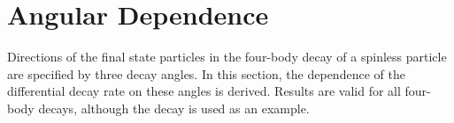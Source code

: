 \section{Angular Dependence} \label{sec:angDependence}
Directions of the final state particles in the four-body decay of a spinless particle are specified
by three decay angles. In this section, the dependence of the differential decay rate on these
angles is derived. Results are valid for all four-body decays, although the decay
\BdtomumuKstKpi{} is used as an example.






